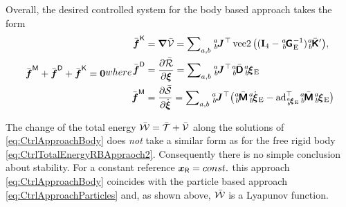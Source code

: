 \begin{RedBox}
Overall, the desired controlled system for the body based approach takes the form
\begin{subequations}\label{eq:CtrlApproachBody}
\begin{align}
 \genForceInertiaC + \genForceDissC + \genForceStiffC = \tuple{0}
\end{align}
where
\begin{align}
 \genForceStiffC
 &= \differential \potentialEnergyC
 = \sum\nolimits_{\BidxI,\BidxII} \bodyJac{\BidxI}{\BidxII}^\top \veeTwoOp \big( (\idMat[4] - \bodyHomoCoordE{\BidxI}{\BidxII}^{-1}) \bodyStiffMatCp{\BidxI}{\BidxII} \big),
\\
 \genForceDissC
 &= \pdiff[\dissFktC]{\sysVel}
 = \sum\nolimits_{\BidxI,\BidxII} \bodyJac{\BidxI}{\BidxII}^\top \bodyDissMatC{\BidxI}{\BidxII} \bodyVelE{\BidxI}{\BidxII}
\\
 \genForceInertiaC
 &= \pdiff[\accEnergyC]{\sysVeld}
 = \sum\nolimits_{\BidxI,\BidxII} \bodyJac{\BidxI}{\BidxII}^\top \big( \bodyInertiaMatC{\BidxI}{\BidxII} \bodyVelEd{\BidxI}{\BidxII} - \ad{\bodyVelE{\BidxI}{\BidxII}}^\top \bodyInertiaMatC{\BidxI}{\BidxII} \bodyVelE{\BidxI}{\BidxII} \big)
\end{align}
\end{subequations} 
\end{RedBox}

The change of the total energy $\bar{\mathcal{W}} = \bar{\mathcal{T}} + \bar{\mathcal{V}}$ along the solutions of \eqref{eq:CtrlApproachBody} does \textit{not} take a similar form as for the free rigid body \eqref{eq:CtrlTotalEnergyRBAppraoch2}.
Consequently there is no simple conclusion about stability.
For a constant reference $\boldsymbol{x}_{\mathsf{R}} = const.$ this approach \eqref{eq:CtrlApproachBody} coincides with the particle based approach \eqref{eq:CtrlApproachParticles} and, as shown above, $\bar{\mathcal{W}}$ is a Lyapunov function.
